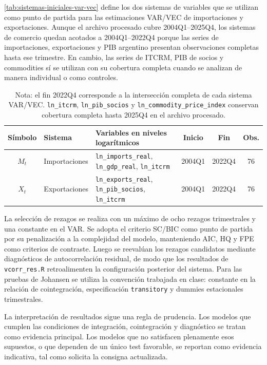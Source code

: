 \documentclass[11pt,a4paper]{article}
\begin{document}
	\autoref{tab:sistemas-iniciales-var-vec} define los dos sistemas de variables
	que se utilizan como punto de partida para las estimaciones VAR/VEC de
	importaciones y exportaciones. Aunque el archivo procesado cubre 2004Q1--2025Q4,
	los sistemas de comercio quedan acotados a 2004Q1--2022Q4 porque las series de
	importaciones, exportaciones y PIB argentino presentan observaciones completas
	hasta ese trimestre. En cambio, las series de ITCRM, PIB de socios y commodities
	sí se utilizan con su cobertura completa cuando se analizan de manera individual
	o como controles.
	
	\begin{table}[H]
		\centering
		\caption{Sistemas iniciales para VAR/VEC.}
		\label{tab:sistemas-iniciales-var-vec}
		\small
		\begin{tabular}{clp{7.1cm}ccc}
			\toprule
			Símbolo & Sistema & Variables en niveles logarítmicos & Inicio & Fin & Obs. \\
			\midrule
			\(M_t\) & Importaciones &
			\texttt{ln\_imports\_real}, \texttt{ln\_gdp\_real}, \texttt{ln\_itcrm}
			& 2004Q1 & 2022Q4 & 76 \\
			\(X_t\) & Exportaciones &
			\texttt{ln\_exports\_real}, \texttt{ln\_pib\_socios}, \texttt{ln\_itcrm}
			& 2004Q1 & 2022Q4 & 76 \\
			\bottomrule
		\end{tabular}
		\caption*{\footnotesize Nota: el fin 2022Q4 corresponde a la intersección
			completa de cada sistema VAR/VEC. \texttt{ln\_itcrm},
			\texttt{ln\_pib\_socios} y \texttt{ln\_commodity\_price\_index} conservan
			cobertura completa hasta 2025Q4 en el archivo procesado.}
	\end{table}
	
	La selección de rezagos se realiza con un máximo de ocho rezagos trimestrales y
	una constante en el VAR. Se adopta el criterio SC/BIC como punto de partida por
	su penalización a la complejidad del modelo, manteniendo AIC, HQ y FPE como
	criterios de contraste. Luego se reevalúan los rezagos candidatos mediante
	diagnósticos de autocorrelación residual, de modo que los resultados de
	\texttt{vcorr\_res.R} retroalimenten la configuración posterior del sistema.
	Para las pruebas de Johansen se utiliza la convención trabajada en clase:
	constante en la relación de cointegración, especificación \texttt{transitory} y
	dummies estacionales trimestrales.
	
	La interpretación de resultados sigue una regla de prudencia. Los modelos que
	cumplen las condiciones de integración, cointegración y diagnóstico se tratan
	como evidencia principal. Los modelos que no satisfacen plenamente esos
	supuestos, o que dependen de un único test favorable, se reportan como evidencia
	indicativa, tal como solicita la consigna actualizada.
	
\end{document}
